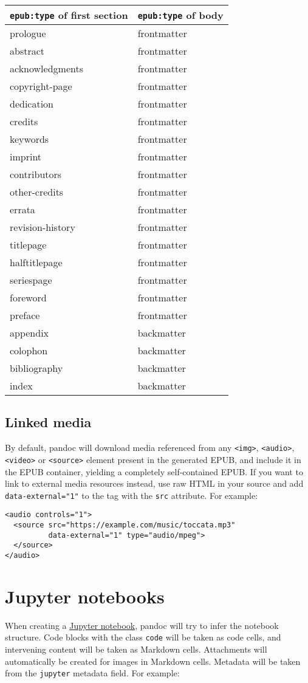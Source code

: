 \documentclass[]{article}
\begin{document}
\begin{longtable}[]{@{}ll@{}}
\toprule
\texttt{epub:type} of first section & \texttt{epub:type} of
body\tabularnewline
\midrule
\endhead
prologue & frontmatter\tabularnewline
abstract & frontmatter\tabularnewline
acknowledgments & frontmatter\tabularnewline
copyright-page & frontmatter\tabularnewline
dedication & frontmatter\tabularnewline
credits & frontmatter\tabularnewline
keywords & frontmatter\tabularnewline
imprint & frontmatter\tabularnewline
contributors & frontmatter\tabularnewline
other-credits & frontmatter\tabularnewline
errata & frontmatter\tabularnewline
revision-history & frontmatter\tabularnewline
titlepage & frontmatter\tabularnewline
halftitlepage & frontmatter\tabularnewline
seriespage & frontmatter\tabularnewline
foreword & frontmatter\tabularnewline
preface & frontmatter\tabularnewline
appendix & backmatter\tabularnewline
colophon & backmatter\tabularnewline
bibliography & backmatter\tabularnewline
index & backmatter\tabularnewline
\bottomrule
\end{longtable}

\hypertarget{linked-media}{%
\subsection{Linked media}\label{linked-media}}

By default, pandoc will download media referenced from any
\texttt{\textless{}img\textgreater{}},
\texttt{\textless{}audio\textgreater{}},
\texttt{\textless{}video\textgreater{}} or
\texttt{\textless{}source\textgreater{}} element present in the
generated EPUB, and include it in the EPUB container, yielding a
completely self-contained EPUB. If you want to link to external media
resources instead, use raw HTML in your source and add
\texttt{data-external="1"} to the tag with the \texttt{src} attribute.
For example:

\begin{verbatim}
<audio controls="1">
  <source src="https://example.com/music/toccata.mp3"
          data-external="1" type="audio/mpeg">
  </source>
</audio>
\end{verbatim}

\hypertarget{jupyter-notebooks}{%
\section{Jupyter notebooks}\label{jupyter-notebooks}}

When creating a
\href{https://nbformat.readthedocs.io/en/latest/}{Jupyter notebook},
pandoc will try to infer the notebook structure. Code blocks with the
class \texttt{code} will be taken as code cells, and intervening content
will be taken as Markdown cells. Attachments will automatically be
created for images in Markdown cells. Metadata will be taken from the
\texttt{jupyter} metadata field. For example:
\end{document}
